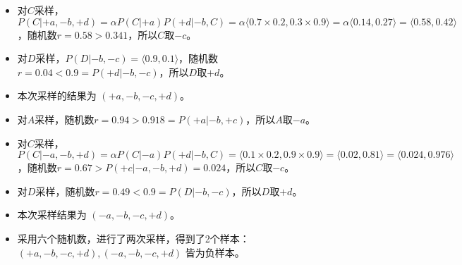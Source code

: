 \begin{enumerate}
\begin{solution}
\begin{itemize}
            \item 对$C$采样，$P(C| +a,-b,+d)=\alpha P(C|+a)P(+d|-b,C)=\alpha\langle 0.7\times 0.2, 0.3\times 0.9 \rangle=\alpha\langle 0.14,0.27 \rangle=\langle 0.58,0.42\rangle$，随机数$r=0.58>0.341$，所以$C$取$-c$。
            \item 对$D$采样，$P(D| -b,-c)=\langle 0.9,0.1 \rangle$，随机数 $r=0.04<0.9=P(+d|-b,-c)$，所以$D$取$+d$。
            \item 本次采样的结果为 $(+a,-b,-c,+d)$。
            \item 对$A$采样，随机数$r=0.94>0.918=P(+a|-b,+c)$，所以$A$取$-a$。
            \item 对$C$采样，$P(C| -a,-b,+d)=\alpha P(C|-a)P(+d|-b,C)=\langle 0.1\times 0.2, 0.9\times 0.9\rangle=\langle 0.02,0.81 \rangle=\langle 0.024,0.976 \rangle$，随机数$r=0.67>P(+c|-a,-b,+d)=0.024$，所以$C$取$-c$。
            \item 对$D$采样，随机数$r=0.49<0.9=P(D|-b,-c)$，所以$D$取$+d$。
            \item 本次采样结果为 $(-a,-b,-c,+d)$。
            \item 采用六个随机数，进行了两次采样，得到了2个样本：$(+a,-b,-c,+d), (-a, -b, -c, +d)$ 皆为负样本。
        \end{itemize}
    \end{solution}
\end{enumerate}

